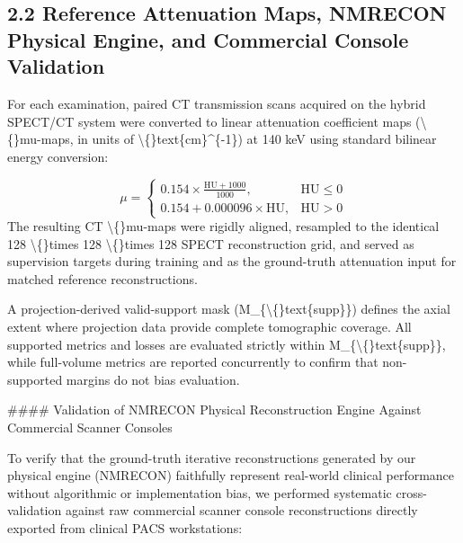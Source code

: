 \documentclass[11pt]{article}
\begin{document}
\subsection*{2.2 Reference Attenuation Maps, NMRECON Physical Engine, and Commercial Console Validation}
For each examination, paired CT transmission scans acquired on the hybrid SPECT/CT system were converted to linear attenuation coefficient maps (\textbackslash\{\}mu-maps, in units of \textbackslash\{\}text\{cm\}\textasciicircum{}\{-1\}) at 140 keV using standard bilinear energy conversion:\par

\begin{equation*}\mu = \begin{cases} 0.154 \times \frac{\text{HU} + 1000}{1000}, & \text{HU} \le 0 \\ 0.154 + 0.000096 \times \text{HU}, & \text{HU} > 0 \end{cases}\end{equation*}
The resulting CT \textbackslash\{\}mu-maps were rigidly aligned, resampled to the identical 128 \textbackslash\{\}times 128 \textbackslash\{\}times 128 SPECT reconstruction grid, and served as supervision targets during training and as the ground-truth attenuation input for matched reference reconstructions.\par

A projection-derived valid-support mask (M\_\{\textbackslash\{\}text\{supp\}\}) defines the axial extent where projection data provide complete tomographic coverage. All supported metrics and losses are evaluated strictly within M\_\{\textbackslash\{\}text\{supp\}\}, while full-volume metrics are reported concurrently to confirm that non-supported margins do not bias evaluation.\par

\#\#\#\# Validation of NMRECON Physical Reconstruction Engine Against Commercial Scanner Consoles\par

To verify that the ground-truth iterative reconstructions generated by our physical engine (NMRECON) faithfully represent real-world clinical performance without algorithmic or implementation bias, we performed systematic cross-validation against raw commercial scanner console reconstructions directly exported from clinical PACS workstations:\par
\end{document}
